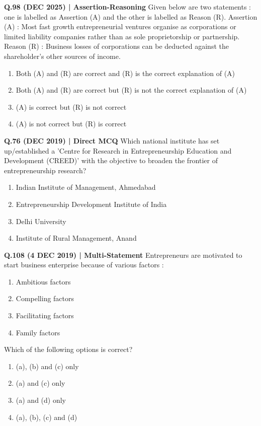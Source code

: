 \documentclass{article}
\begin{document}
\textbf{Q.98 (DEC 2025) | Assertion-Reasoning}
Given below are two statements : one is labelled as Assertion (A) and the other is labelled as Reason (R).
Assertion (A) : Most fast growth entrepreneurial ventures organise as corporations or limited liability companies rather than as sole proprietorship or partnership.
Reason (R) : Business losses of corporations can be deducted against the shareholder's other sources of income.
\begin{enumerate}[label=(\arabic*)]
    \item Both (A) and (R) are correct and (R) is the correct explanation of (A)
    \item Both (A) and (R) are correct but (R) is not the correct explanation of (A)
    \item (A) is correct but (R) is not correct
    \item (A) is not correct but (R) is correct
\end{enumerate}

\textbf{Q.76 (DEC 2019) | Direct MCQ}
Which national institute has set up/established a 'Centre for Research in Entrepreneurship Education and Development (CREED)' with the objective to broaden the frontier of entrepreneurship research?
\begin{enumerate}[label=(\arabic*)]
    \item Indian Institute of Management, Ahmedabad
    \item Entrepreneurship Development Institute of India
    \item Delhi University
    \item Institute of Rural Management, Anand
\end{enumerate}

\textbf{Q.108 (4 DEC 2019) | Multi-Statement}
Entrepreneurs are motivated to start business enterprise because of various factors :
\begin{enumerate}[label=\alph*.]
    \item Ambitious factors
    \item Compelling factors
    \item Facilitating factors
    \item Family factors
\end{enumerate}
Which of the following options is correct?
\begin{enumerate}[label=(\arabic*)]
    \item (a), (b) and (c) only
    \item (a) and (c) only
    \item (a) and (d) only
    \item (a), (b), (c) and (d)
\end{enumerate}
\end{document}

